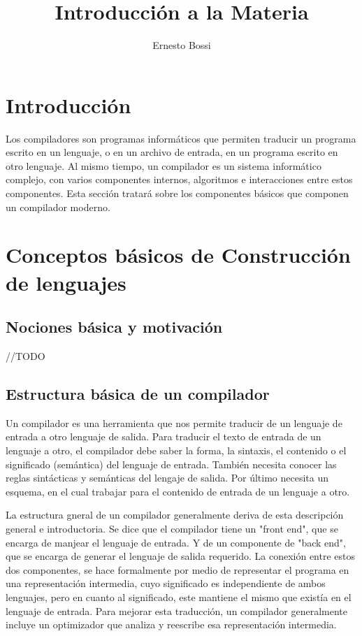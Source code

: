 \documentclass[fleqn]{tcdl}
\title{Introducción a la Materia}
\author[1]{Ernesto Bossi}
\affil[1]{Profesor}
\begin{document}
\flushbottom
\maketitle
\thispagestyle{empty}

\section*{Introducción}
\fontsize{11}{14}\selectfont

Los compiladores son programas informáticos que permiten traducir un programa escrito en un lenguaje, o en un archivo de entrada, en un programa escrito en otro lenguaje. Al mismo tiempo, un compilador es un sistema informático complejo, con varios componentes internos, algoritmos e interacciones entre estos componentes. Esta sección tratará sobre 
los componentes básicos que componen un compilador moderno.

\section*{Conceptos básicos de Construcción de lenguajes}

\subsection*{Nociones básica y motivación}

//TODO

\subsection*{Estructura básica de un compilador}

Un compilador es una herramienta que nos permite traducir de un lenguaje de entrada a otro lenguaje de salida. Para traducir el texto de entrada de un lenguaje a otro, el compilador debe saber la forma, la sintaxis, el contenido o el significado (semántica) del lenguaje de entrada. También necesita conocer las reglas sintácticas y semánticas del lengaje de salida. Por último necesita un esquema, en el cual trabajar para el contenido de entrada de un lenguaje a otro.

La estructura gneral de un compilador generalmente deriva de esta descripción general e introductoria. Se dice que el compilador tiene un "front end", que se encarga de manjear el lenguaje de entrada. Y de un componente de "back end", que se encarga de generar el lenguaje de salida requerido. La conexión entre estos dos componentes, se hace formalmente por medio de representar el programa en una representación intermedia, cuyo significado es independiente de ambos lenguajes, pero en cuanto al significado, este mantiene el mismo que existía en el lenguaje de entrada. Para mejorar esta traducción, un compilador generalmente incluye un optimizador que analiza y reescribe esa representación intermedia.
\end{document}
